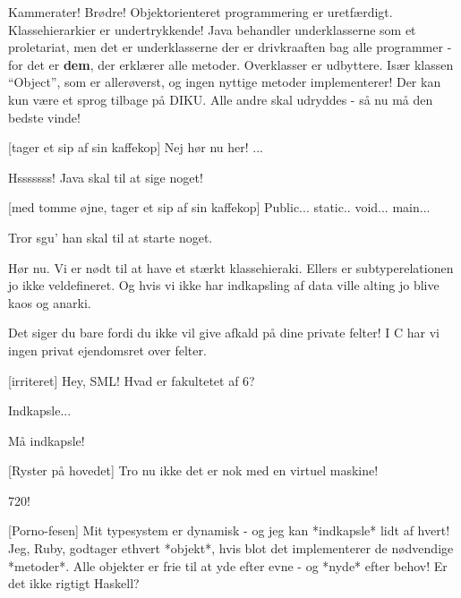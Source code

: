 \documentclass[a4paper,11pt]{article}
\begin{document}
  
\begin{sketch}

 Kammerater! Br\o{}dre! Objektorienteret programmering er uretf\ae{}rdigt.
Klassehierarkier er undertrykkende! Java behandler underklasserne som
et proletariat, men det er underklasserne der er drivkraaften bag alle
programmer - for det er \textbf{dem}, der erkl\ae{}rer alle metoder. Overklasser
er udbyttere. Is\ae{}r klassen ``Object'', som er aller\o{}verst, og ingen
nyttige metoder implementerer! Der kan kun v\ae{}re et sprog tilbage p\aa{}
DIKU. Alle andre skal udryddes - s\aa{} nu m\aa{} den bedste vinde!

[tager et sip af sin kaffekop]  Nej h\o{}r nu her! ... 


 Hsssssss! Java skal til at sige noget!

[med tomme \o{}jne, tager et sip af sin kaffekop] Public...
static.. void... main...

 Tror sgu' han skal til at starte noget.

 H\o{}r nu. Vi er n\o{}dt til at have et st\ae{}rkt klassehieraki. Ellers er subtyperelationen jo ikke veldefineret. Og hvis vi ikke har indkapsling af data ville alting jo blive kaos og anarki.

 Det siger du bare fordi du ikke vil give afkald p\aa{} dine private
felter! I C har vi ingen privat ejendomsret over felter.


[irriteret] Hey, SML! Hvad er fakultetet af 6?


 Indkapsle... 


 M\aa{} indkapsle! 

[Ryster p\aa{} hovedet] Tro nu ikke det er nok med en virtuel maskine!


 720! 

[Porno-fesen] Mit typesystem er dynamisk - og jeg kan
*indkapsle* lidt af hvert! Jeg, Ruby, godtager ethvert *objekt*, hvis
blot det implementerer de n\o{}dvendige *metoder*. Alle objekter er frie
til at yde efter evne - og *nyde* efter behov! Er det ikke rigtigt
Haskell?


\end{sketch}
\end{document}
